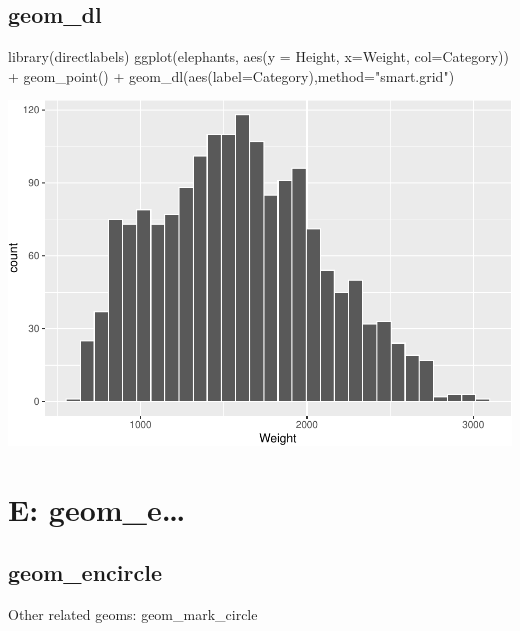 \documentclass[
]{book}
\newenvironment{Shaded}{\begin{snugshade}}{\end{snugshade}}
\newcommand{\AttributeTok}[1]{\textcolor[rgb]{0.77,0.63,0.00}{#1}}
\newcommand{\FunctionTok}[1]{\textcolor[rgb]{0.00,0.00,0.00}{#1}}
\newcommand{\NormalTok}[1]{#1}
\newcommand{\SpecialCharTok}[1]{\textcolor[rgb]{0.00,0.00,0.00}{#1}}
\newcommand{\StringTok}[1]{\textcolor[rgb]{0.31,0.60,0.02}{#1}}
\begin{document}
\hypertarget{geom_dl}{%
\section{geom\_dl}\label{geom_dl}}

\begin{Shaded}
\begin{Highlighting}[]
\FunctionTok{library}\NormalTok{(directlabels)}
\FunctionTok{ggplot}\NormalTok{(elephants, }\FunctionTok{aes}\NormalTok{(}\AttributeTok{y =}\NormalTok{ Height, }\AttributeTok{x=}\NormalTok{Weight, }\AttributeTok{col=}\NormalTok{Category)) }\SpecialCharTok{+} 
  \FunctionTok{geom\_point}\NormalTok{() }\SpecialCharTok{+}
  \FunctionTok{geom\_dl}\NormalTok{(}\FunctionTok{aes}\NormalTok{(}\AttributeTok{label=}\NormalTok{Category),}\AttributeTok{method=}\StringTok{"smart.grid"}\NormalTok{)}
\end{Highlighting}
\end{Shaded}

\includegraphics{Data-Visualisation-geom-Encyclopedia_files/figure-latex/unnamed-chunk-39-1.pdf}

\hypertarget{e-geom_e}{%
\chapter{E: geom\_e\ldots{}}\label{e-geom_e}}

\hypertarget{geom_encircle}{%
\section{geom\_encircle}\label{geom_encircle}}

Other related geoms: geom\_mark\_circle
\end{document}
